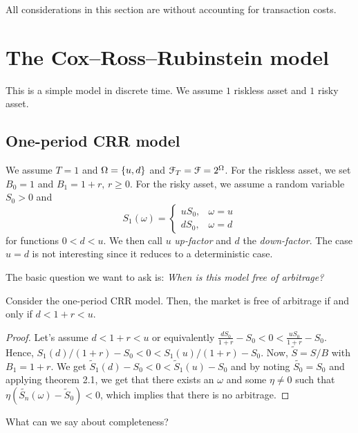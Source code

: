 \documentclass[12pt]{amsart}
\begin{document}
\begin{remark}
    All considerations in this section are without accounting for transaction costs.
\end{remark}

\section{The Cox--Ross--Rubinstein model}

This is a simple model in discrete time. We assume \(1\) riskless asset and \(1\) risky asset.

\subsection{One-period CRR model}

We assume \(T=1\) and \(\Omega=\left\{ u, d \right\}\) and \(\mathcal{F}_T = \mathcal{F} = 2^\Omega\). For the riskless asset, we set \(B_0=1\) and \(B_1 = 1+r,\, r \geq 0\). For the risky asset, we assume a random variable \(S_0 > 0\) and \[
    S_1(\omega) = \begin{cases}
        uS_0, &\omega=u\\
        dS_0, &\omega=d
    \end{cases}
\]
for functions \(0 < d < u\). We then call \(u\) \emph{up-factor} and \(d\) the \emph{down-factor}. The case \(u=d\) is not interesting since it reduces to a deterministic case.

The basic question we want to ask is: \emph{When is this model free of arbitrage?}

\begin{theorem}\label{th:CRR_NA}
    Consider the one-period CRR model. Then, the market is free of arbitrage if and only if \(d < 1 + r < u\).
\end{theorem}
\begin{proof}
    Let's assume \(d < 1+r < u\) or equivalently \(\frac{dS_0}{1+r} - S_0 < 0 < \frac{u S_0}{1+r} - S_0\). Hence, \(S_1(d)/(1+r)-S_0 < 0 < S_1(u)/(1+r)-S_0\). Now, \(\tilde{S} = S/B\) with \(B_1 = 1+r\). We get \(\tilde{S}_1(d) - S_0 < 0 < \tilde{S}_1(u) - S_0\) and by noting \(\tilde{S_0} = S_0\) and applying theorem 2.1, we get that there exists an \(\omega\) and some \(\eta \neq 0\) such that \(\eta(\tilde{S_n}(\omega) - \tilde{S}_0) < 0\), which implies that there is no arbitrage.
\end{proof}

What can we say about completeness?
\end{document}
